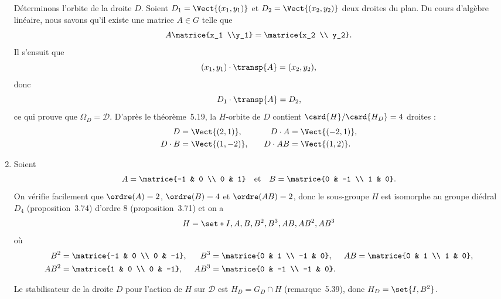 \begin{enumerate}
    Déterminons l'orbite de la droite $D$.
    Soient $D_1 = \Vect{(x_1, y_1)}$ et $D_2 = \Vect{(x_2, y_2)}$ deux droites du plan.
    Du cours d'algèbre linéaire, nous savons qu'il existe une matrice $A\in G$ telle que
    \[
      A\matrice{x_1 \\y_1} = \matrice{x_2 \\ y_2}.
    \]
    Il s'ensuit que
    \[
      (x_1, y_1) \cdot \transp{A} = (x_2, y_2),
    \]
    donc
    \[
      D_1 \cdot \transp{A} = D_2,
    \]
    ce qui prouve que $\Omega_D = \mathcal{D}$.
    D'après le théorème~5.19, la $H$-orbite de $D$ contient $\card{H}/\card{H_D} = 4$ droites :
    \begin{align*}
      D &= \Vect{(2, 1)},
        &\quad D\cdot A &= \Vect{(-2, 1)}, \\
      D\cdot B &= \Vect{(1, -2)},
        &\quad D\cdot AB &= \Vect{(1, 2)}.
    \end{align*}

  \item
    Soient
    \[
      A = \matrice{-1 & 0 \\ 0 & 1}
      \quad\text{et}\quad
      B = \matrice{0 & -1 \\ 1 & 0}.
    \]
    On vérifie facilement que $\ordre(A) = 2$, $\ordre(B) = 4$ et $\ordre(AB) = 2$, donc le sous-groupe $H$ est isomorphe au groupe diédral $D_4$ (proposition~3.74) d'ordre $8$ (proposition~3.71) et on a
    \[
      H = \set*{I, A, B, B^2, B^3, AB, AB^2, AB^3}
    \]
    où
    \begin{align*}
      B^2 &= \matrice{-1 & 0 \\ 0 & -1}, & B^3 &= \matrice{0 & 1 \\ -1 & 0},  & AB &= \matrice{0 & 1 \\ 1 & 0}, \\
      AB^2 &= \matrice{1 & 0 \\ 0 & -1}, & AB^3 &= \matrice{0 & -1 \\ -1 & 0}.
    \end{align*}

    Le stabilisateur de la droite $D$ pour l'action de $H$ sur $\mathcal{D}$ est $H_D = G_D\cap H$ (remarque~5.39), donc $H_D = \set{I, B^2}$.
\end{enumerate}
